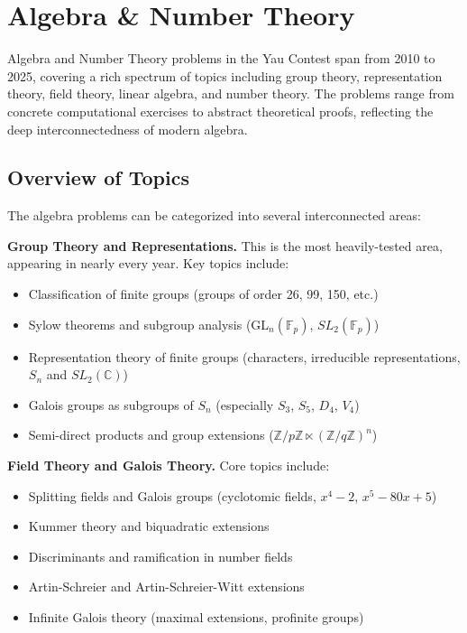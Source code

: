 \section{Algebra \& Number Theory}
\label{sec:algebra}

Algebra and Number Theory problems in the Yau Contest span from 2010 to 2025, covering a rich spectrum of topics including group theory, representation theory, field theory, linear algebra, and number theory. The problems range from concrete computational exercises to abstract theoretical proofs, reflecting the deep interconnectedness of modern algebra.

\subsection{Overview of Topics}

The algebra problems can be categorized into several interconnected areas:

\medskip
\noindent\textbf{Group Theory and Representations.} This is the most heavily-tested area, appearing in nearly every year. Key topics include:
\begin{itemize}
    \item Classification of finite groups (groups of order 26, 99, 150, etc.)
    \item Sylow theorems and subgroup analysis (GL$_n(\mathbb{F}_p)$, $SL_2(\mathbb{F}_p)$)
    \item Representation theory of finite groups (characters, irreducible representations, $S_n$ and $SL_2(\mathbb{C})$)
    \item Galois groups as subgroups of $S_n$ (especially $S_3$, $S_5$, $D_4$, $V_4$)
    \item Semi-direct products and group extensions ($\mathbb{Z}/p\mathbb{Z} \ltimes (\mathbb{Z}/q\mathbb{Z})^n$)
\end{itemize}

\medskip
\noindent\textbf{Field Theory and Galois Theory.} Core topics include:
\begin{itemize}
    \item Splitting fields and Galois groups (cyclotomic fields, $x^4-2$, $x^5-80x+5$)
    \item Kummer theory and biquadratic extensions
    \item Discriminants and ramification in number fields
    \item Artin-Schreier and Artin-Schreier-Witt extensions
    \item Infinite Galois theory (maximal extensions, profinite groups)
\end{itemize}

